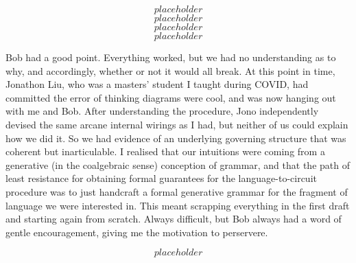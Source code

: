 \begin{fullwidth}
\[placeholder\]
\[placeholder\]
\[placeholder\]
\[placeholder\]

Bob had a good point. Everything worked, but we had no understanding as to why, and accordingly, whether or not it would all break. At this point in time, Jonathon Liu, who was a masters' student I taught during COVID, had committed the error of thinking diagrams were cool, and was now hanging out with me and Bob. After understanding the procedure, Jono independently devised the same arcane internal wirings as I had, but neither of us could explain how we did it. So we had evidence of an underlying governing structure that was coherent but inarticulable. I realised that our intuitions were coming from a generative (in the coalgebraic sense) conception of grammar, and that the path of least resistance for obtaining formal guarantees for the language-to-circuit procedure was to just handcraft a formal generative grammar for the fragment of language we were interested in. This meant scrapping everything in the first draft and starting again from scratch. Always difficult, but Bob always had a word of gentle encouragement, giving me the motivation to perservere.

\[placeholder\]

\end{fullwidth}